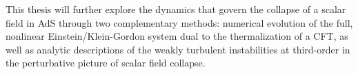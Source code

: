 \documentclass[../PhD.tex]{subfiles}
\begin{document}
This thesis will further explore the dynamics that govern the collapse of a scalar field in AdS through two complementary methods: numerical evolution of the full, nonlinear Einstein/Klein-Gordon system dual to the thermalization of a CFT, as well as analytic descriptions of the weakly turbulent instabilities at third-order in the perturbative picture of scalar field collapse.


%

\end{document}
